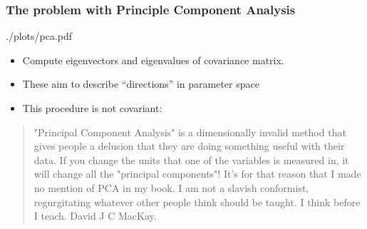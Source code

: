 \documentclass[%
]{beamer}
\begin{document}
\begin{frame}
    \frametitle{The problem with Principle Component Analysis}

    \begin{figright}[0.6]{./plots/pca.pdf}
        \begin{itemize}
            \item Compute eigenvectors and eigenvalues of covariance matrix.
            \item These aim to describe ``directions'' in parameter space
            \item This procedure is not covariant:
        \end{itemize}
    \end{figright}
    \begin{quote}
        "Principal Component Analysis" is a dimensionally invalid method that gives people a delusion that they are doing something useful with their data. If you change the units that one of the variables is measured in, it will change all the "principal components"! It's for that reason that I made no mention of PCA in my book. I am not a slavish conformist, regurgitating whatever other people think should be taught. I think before I teach. David J C MacKay.

        \end{quote}
\end{frame}
\end{document}
